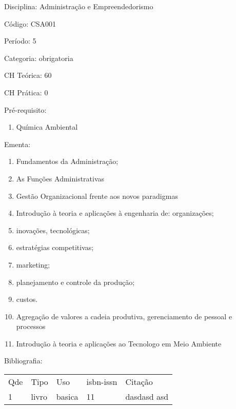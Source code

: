 \documentclass[12pt,a4paper,twoside]{report}
\begin{document}
Disciplina: Administração e Empreendedorismo

Código: CSA001

Período: 5

Categoria: obrigatoria

CH Teórica: 60

CH Prática: 0




Pré-requisito:
\begin{enumerate}
\item Química Ambiental
\end{enumerate}

Ementa:
\begin{enumerate}
\item Fundamentos da Administração;
\item As Funções Administrativas
\item Gestão Organizacional frente aos novos paradigmas
\item Introdução à teoria e aplicações à engenharia de: organizações;
\item inovações, tecnológicas;
\item estratégias competitivas;
\item marketing;
\item planejamento e controle da produção;
\item custos.
\item Agregação de valores a cadeia produtiva, gerenciamento de pessoal e processos
\item Introdução à teoria e aplicações ao Tecnologo em Meio Ambiente
\end{enumerate}



Bibliografia:


\begin{tabular}{llllp{8cm}}
Qde & Tipo & Uso & isbn-issn & Citação \\
1&livro&basica&11&dasdasd asd\\
\end{tabular}
\end{document}
